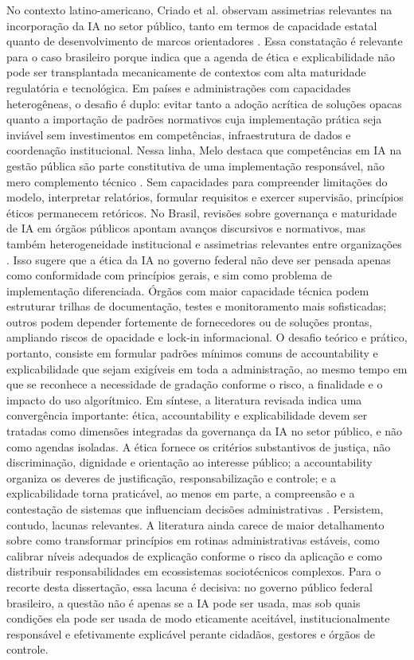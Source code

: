 \documentclass[12pt,a4paper]{article}
\begin{document}
No contexto latino-americano, Criado et al. observam assimetrias relevantes na incorporação da IA no setor público, tanto em termos de capacidade estatal quanto de desenvolvimento de marcos orientadores \autocite{criado2024inteligencia}. Essa constatação é relevante para o caso brasileiro porque indica que a agenda de ética e explicabilidade não pode ser transplantada mecanicamente de contextos com alta maturidade regulatória e tecnológica. Em países e administrações com capacidades heterogêneas, o desafio é duplo: evitar tanto a adoção acrítica de soluções opacas quanto a importação de padrões normativos cuja implementação prática seja inviável sem investimentos em competências, infraestrutura de dados e coordenação institucional. Nessa linha, Melo destaca que competências em IA na gestão pública são parte constitutiva de uma implementação responsável, não mero complemento técnico \autocite{melo2026competencias}. Sem capacidades para compreender limitações do modelo, interpretar relatórios, formular requisitos e exercer supervisão, princípios éticos permanecem retóricos.
No Brasil, revisões sobre governança e maturidade de IA em órgãos públicos apontam avanços discursivos e normativos, mas também heterogeneidade institucional e assimetrias relevantes entre organizações \autocite{goulart2025processos} \autocite{mariano2026inteligencia}. Isso sugere que a ética da IA no governo federal não deve ser pensada apenas como conformidade com princípios gerais, e sim como problema de implementação diferenciada. Órgãos com maior capacidade técnica podem estruturar trilhas de documentação, testes e monitoramento mais sofisticadas; outros podem depender fortemente de fornecedores ou de soluções prontas, ampliando riscos de opacidade e lock-in informacional. O desafio teórico e prático, portanto, consiste em formular padrões mínimos comuns de accountability e explicabilidade que sejam exigíveis em toda a administração, ao mesmo tempo em que se reconhece a necessidade de gradação conforme o risco, a finalidade e o impacto do uso algorítmico.
Em síntese, a literatura revisada indica uma convergência importante: ética, accountability e explicabilidade devem ser tratadas como dimensões integradas da governança da IA no setor público, e não como agendas isoladas. A ética fornece os critérios substantivos de justiça, não discriminação, dignidade e orientação ao interesse público; a accountability organiza os deveres de justificação, responsabilização e controle; e a explicabilidade torna praticável, ao menos em parte, a compreensão e a contestação de sistemas que influenciam decisões administrativas \autocite{sigfrids2022how} \autocite{batool2025ai} \autocite{mkander2023auditing}. Persistem, contudo, lacunas relevantes. A literatura ainda carece de maior detalhamento sobre como transformar princípios em rotinas administrativas estáveis, como calibrar níveis adequados de explicação conforme o risco da aplicação e como distribuir responsabilidades em ecossistemas sociotécnicos complexos. Para o recorte desta dissertação, essa lacuna é decisiva: no governo público federal brasileiro, a questão não é apenas se a IA pode ser usada, mas sob quais condições ela pode ser usada de modo eticamente aceitável, institucionalmente responsável e efetivamente explicável perante cidadãos, gestores e órgãos de controle.
\end{document}
